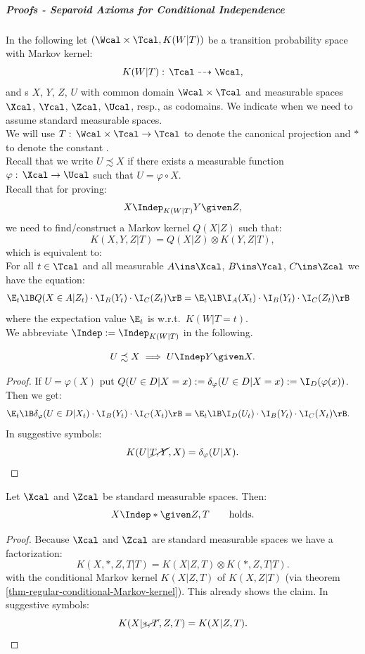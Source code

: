\subparagraph{Proofs - Separoid Axioms for Conditional Independence}\hfill%

In the following let $(\Wcal \times \Tcal, K(W|T))$ be a transition probability space with Markov kernel:
\[K(W|T): \, \Tcal \dashrightarrow  \Wcal,\]
and \trv{}s $X$, $Y$, $Z$, $U$ with common domain $\Wcal\times \Tcal$ and measurable spaces $\Xcal$, 
$\Ycal$, $\Zcal$, $\Ucal$, resp., as codomains. We indicate when we need to assume standard measurable spaces.\\
We will use
$T:\, \Wcal \times \Tcal \to \Tcal$ to denote the canonical projection and $\ast$ to denote the constant \trv{}.\\
Recall that we write $U \precsim X$ if there exists a measurable function  
$\varphi:\, \Xcal \to \Ucal$  such that $U = \varphi \circ X$.\\
Recall that for proving:
\[X \Indep_{K(W|T)} Y \given Z, \]
we need to find/construct a Markov kernel $Q(X|Z)$ such that:
\[ K(X,Y,Z|T) = Q(X|Z) \otimes K(Y,Z|T),\]
which is equivalent to:\\ 
For all $t \in \Tcal$ and all measurable $A \ins \Xcal$, $B \ins \Ycal$, $C \ins \Zcal$ we have the equation:
\begin{align*}
    \E_t\lB Q(X \in A|Z_t) \cdot \I_B(Y_t) \cdot \I_C(Z_t)\rB &= \E_t\lB\I_A(X_t) \cdot \I_B(Y_t) \cdot \I_C(Z_t) \rB 
\end{align*}
where the expectation value $\E_t$ is w.r.t.\ $K(W|T=t)$.\\
We abbreviate $\Indep := \Indep_{K(W|T)}$ in the following.


\begin{Lem}
    \[U \precsim X \implies U \Indep  Y \given X.\]
\begin{proof}
    If $U=\varphi(X)$ put
    $Q(U \in D|X=x):=\delta_\varphi(U \in D|X=x):=\I_D(\varphi(x))$. Then we get:
\begin{align*} 
    \E_t\lB \delta_\varphi(U \in D|X_t) \cdot \I_B(Y_t) \cdot \I_C(X_t) \rB &= \E_t\lB \I_D(U_t) \cdot \I_B(Y_t) \cdot \I_C(X_t) \rB .     
\end{align*}
In suggestive symbols:
\[ K(U|\cancel{T,Y},X) = \delta_\varphi(U|X). \]
\end{proof}
\end{Lem}

\begin{Lem} Let $\Xcal$ and $\Zcal$ be standard measurable spaces. Then:
    \[X \Indep  \ast \given Z,T \qquad \text{holds.}\]
\begin{proof}
    Because $\Xcal$ and $\Zcal$ are standard measurable spaces
    we have a factorization:
    \[ K(X,\ast, Z,T|T) = K(X|Z,T) \otimes K(\ast, Z,T|T).\]
    with the conditional Markov kernel $K(X|Z,T)$ of $K(X,Z|T)$ (via theorem \ref{thm-regular-conditional-Markov-kernel}).
    This already shows the claim. In suggestive symbols:
    \[K(X|\cancel{\ast,T},Z,T) = K(X|Z,T).\]
\end{proof}
\end{Lem}

